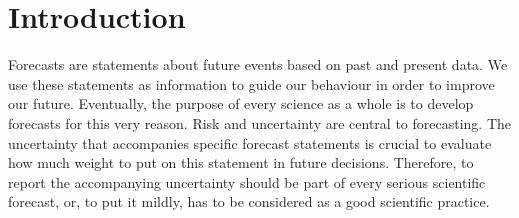 \section{Introduction}
\thispagestyle{plain} %

Forecasts are statements about future events based on past and present data. We use these statements as information to guide our behaviour in order to improve our future. Eventually, the purpose of every science as a whole is to develop forecasts for this very reason. Risk and uncertainty are central to forecasting. The uncertainty that accompanies specific forecast statements is crucial to evaluate how much weight to put on this statement in future decisions. Therefore, to report the accompanying uncertainty should be part of every serious scientific forecast, or, to put it mildly, has to be considered as a good scientific practice.









